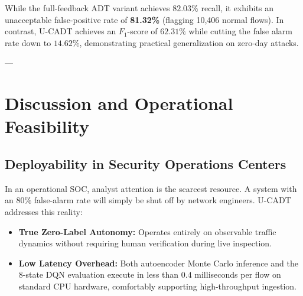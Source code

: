 \documentclass[conference]{IEEEtran}
\begin{document}
\begin{table}[t]
\centering
\caption{UNSW-NB15 Zero-Day Holdout Comparison (Fuzzers Excluded)}
\label{tab:unsw_results}
\end{table}

While the full-feedback ADT variant achieves $82.03\%$ recall, it exhibits an unacceptable false-positive rate of \textbf{81.32\%} (flagging 10,406 normal flows). In contrast, U-CADT achieves an $F_1$-score of $62.31\%$ while cutting the false alarm rate down to $14.62\%$, demonstrating practical generalization on zero-day attacks.

---

\section{Discussion and Operational Feasibility}

\subsection{Deployability in Security Operations Centers}
In an operational SOC, analyst attention is the scarcest resource. A system with an $80\%$ false-alarm rate will simply be shut off by network engineers. U-CADT addresses this reality:
\begin{itemize}
    \item \textbf{True Zero-Label Autonomy:} Operates entirely on observable traffic dynamics without requiring human verification during live inspection.
    \item \textbf{Low Latency Overhead:} Both autoencoder Monte Carlo inference and the 8-state DQN evaluation execute in less than $0.4$ milliseconds per flow on standard CPU hardware, comfortably supporting high-throughput ingestion.
\end{itemize}
\end{document}
